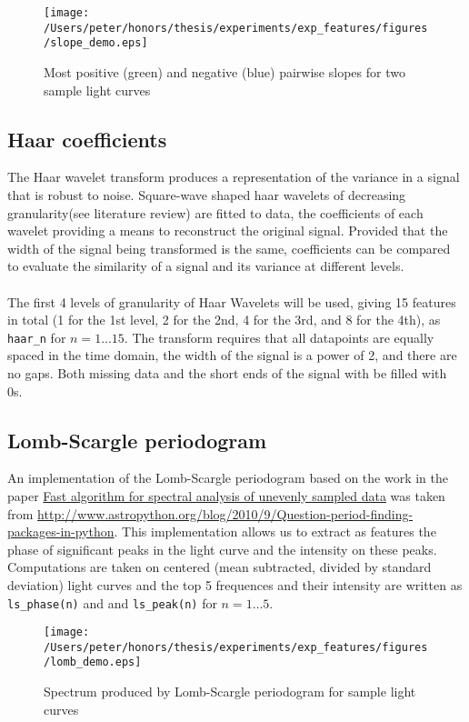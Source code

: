 	\begin{figure}[ht!]
		\label{fig:slopesample}
		\texttt{[image: /Users/peter/honors/thesis/experiments/exp\_features/figures/slope\_demo.eps]}
		\caption{Most positive (green) and negative (blue) pairwise slopes for two sample light curves}
	\end{figure}
	
	\subsection{Haar coefficients}
	The Haar wavelet transform produces a representation of the variance in a signal that is robust to noise. Square-wave shaped haar wavelets of decreasing granularity(see literature review) are fitted to data, the coefficients of each wavelet providing a means to reconstruct the original signal. Provided that the width of the signal being transformed is the same, coefficients can be compared to evaluate the similarity of a signal and its variance at different levels. \\ \\ %
	The first 4 levels of granularity of Haar Wavelets will be used, giving 15 features in total (1 for the 1st level, 2 for the 2nd, 4 for the 3rd, and 8 for the 4th), as \verb#haar_n# for $n = 1 \ldots 15$. The transform requires that all datapoints are equally spaced in the time domain, the width of the signal is a power of 2, and there are no gaps. Both missing data and the short ends of the signal with be filled with 0s.
	
	\subsection{Lomb-Scargle periodogram}
	An implementation of the Lomb-Scargle periodogram based on the work in the paper \href{http://adsabs.harvard.edu/abs/1989ApJ...338..277P}{Fast algorithm for spectral analysis of unevenly sampled data} was taken from \url{http://www.astropython.org/blog/2010/9/Question-period-finding-packages-in-python}. This implementation allows us to extract as features the phase of significant peaks in the light curve and the intensity on these peaks. Computations are taken on centered (mean subtracted, divided by standard deviation) light curves and the top 5 frequences and their intensity are written as \verb#ls_phase(n)# and and \verb#ls_peak(n)# for $n = 1\ldots 5$. \\ %
	\begin{figure}[ht!]
		\label{fig:lsspectrum}
		\texttt{[image: /Users/peter/honors/thesis/experiments/exp\_features/figures/lomb\_demo.eps]}
		\caption{Spectrum produced by Lomb-Scargle periodogram for sample light curves}
	\end{figure}
	
